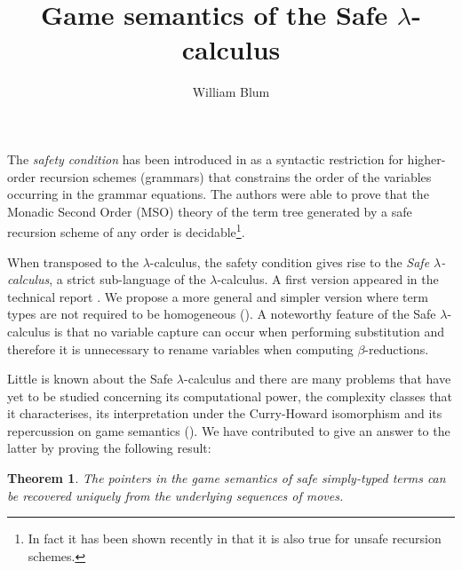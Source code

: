 \documentclass{ouclprgsc}
\newtheorem{thm}{Theorem}
\begin{document}
\title{Game semantics of the Safe $\lambda$-calculus}

\author{William Blum}

\maketitle

\vspace{0.5cm}

The \emph{safety condition} has been introduced in \cite{KNU02} as a
syntactic restriction for higher-order recursion schemes (grammars)
that constrains the order of the variables occurring in the grammar
equations. The authors were able to prove that the Monadic Second
Order (MSO) theory of the term tree generated by a safe recursion
scheme of any order is decidable\footnote{In fact it has been shown
recently in \cite{OngLics2006} that it is also true for unsafe
recursion schemes.}.

When transposed to the $\lambda$-calculus, the safety condition
gives rise to the \emph{Safe $\lambda$-calculus}, a strict
sub-language of the $\lambda$-calculus. A first version appeared in
the technical report \cite{safety-mirlong2004}. We propose a more
general and simpler version where term types are not required to be
homogeneous (\cite{blumtransfer}). A noteworthy feature of the Safe
$\lambda$-calculus is that no variable capture can occur when
performing substitution and therefore it is unnecessary to rename
variables when computing $\beta$-reductions.

Little is known about the Safe $\lambda$-calculus and there are many
 problems that have yet to be studied concerning its
computational power, the complexity classes that it characterises,
its interpretation under the Curry-Howard isomorphism and its
repercussion on game semantics
(\cite{abramsky:game-semantics-tutorial}). We have contributed to
give an answer to the latter by proving the following result:
\begin{thm}
\label{thm:safeptrrecover} The pointers in the game semantics of
safe simply-typed terms can be recovered uniquely from the
underlying sequences of moves.
\end{thm}
\end{document}

